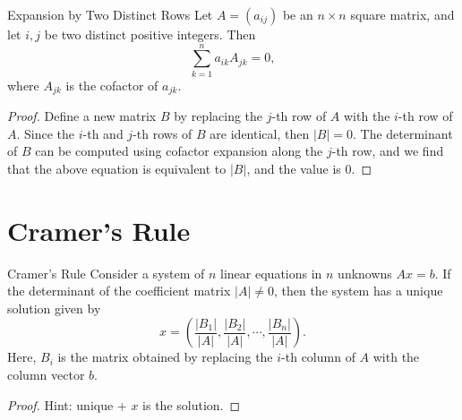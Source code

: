 \begin{proposition}{Expansion by Two Distinct Rows}{}
  Let $A = (a_{ij})$ be an $n \times n$ square matrix,
  and let $i, j$ be two distinct positive integers.
  Then
  \begin{equation}
    \sum\limits_{k = 1}^n a_{ik} A_{jk} = 0,
  \end{equation}
  where $A_{jk}$ is the cofactor of $a_{jk}$.
\end{proposition}

\begin{proof}
  Define a new matrix $B$ by replacing the $j$-th row of $A$ with the
  $i$-th row of $A$.
  Since the $i$-th and $j$-th rows of $B$ are identical, then $|B| = 0$.
  The determinant of $B$ can be computed using cofactor expansion along the
  $j$-th row, and we find that the above equation is equivalent to $|B|$,
  and the value is $0$.
\end{proof}

\section{Cramer's Rule}

\begin{theorem}{Cramer's Rule}{}
  Consider a system of $n$ linear equations in $n$ unknowns $Ax = b$.
  If the determinant of the coefficient matrix $|A| \neq 0$,
  then the system has a unique solution given by
  \begin{equation}
    x = \left( \frac{|B_1|}{|A|}, \frac{|B_2|}{|A|}, \cdots, \frac{|B_n|}{|A|} \right).
  \end{equation}
  Here, $B_i$ is the matrix obtained by replacing the $i$-th column of $A$
  with the column vector $b$.
\end{theorem}

\begin{proof}
  Hint: unique + $x$ is the solution.
\end{proof}









